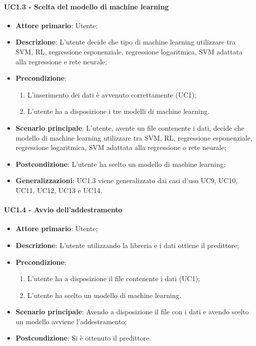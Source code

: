 \paragraph{UC1.3 - Scelta del modello di machine learning}%
\label{para:uc1.3}
\begin{itemize}
  \item \textbf{Attore primario}: Utente;
  \item \textbf{Descrizione}: L'utente decide che tipo di machine learning utilizzare tra SVM, RL, regressione esponenziale, regressione logaritmica, SVM adattata alla regressione e rete neurale;
  \item \textbf{Precondizione}:
  \begin{enumerate}
    \item L'inserimento dei dati è avvenuto correttamente (UC1);
    \item L'utente ha a disposizione i tre modelli di machine learning.
  \end{enumerate}
  \item \textbf{Scenario principale}: L'utente, avente un file contenente i dati, decide che modello di machine learning utilizzare tra SVM, RL, regressione esponenziale, regressione logaritmica, SVM adattata alla regressione o rete neurale;
  \item \textbf{Postcondizione}: L'utente ha scelto un modello di machine learning;
  \item \textbf{Generalizzazioni}: UC1.3 viene generalizzato dai casi d'uso  UC9, UC10, UC11, UC12, UC13 e UC14.
\end{itemize}

\paragraph{UC1.4 - Avvio dell'addestramento}
\label{para:uc1.4}
\begin{itemize}
  \item \textbf{Attore primario}: Utente;
  \item \textbf{Descrizione}: L'utente utilizzando la libreria e i dati ottiene il predittore;
  \item \textbf{Precondizione}:
  \begin{enumerate}
    \item L'utente ha a disposizione il file contenente i dati (UC1);
    \item L'utente ha scelto un modello di machine learning.
  \end{enumerate}
  \item \textbf{Scenario principale}: Avendo a disposizione il file con i dati e avendo scelto un modello avviene l'addestramento;
  \item \textbf{Postcondizione}: Si è ottenuto il predittore.
\end{itemize}

